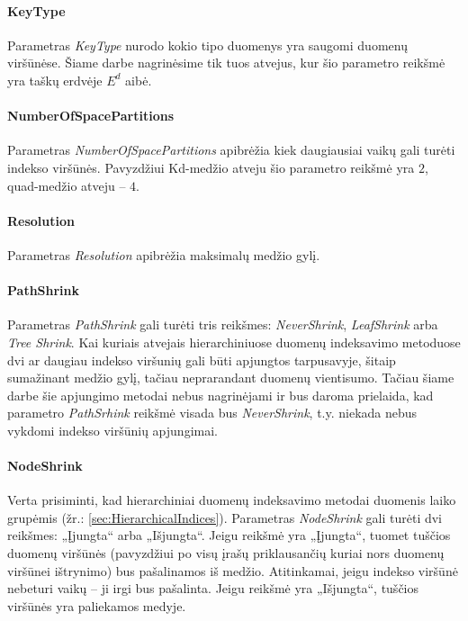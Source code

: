 \paragraph{KeyType}
Parametras {\it KeyType} nurodo kokio tipo duomenys yra saugomi duomenų viršūnėse.
Šiame darbe nagrinėsime tik tuos atvejus, kur šio parametro reikšmė yra taškų erdvėje $E^d$ aibė.

\paragraph{NumberOfSpacePartitions}
Parametras {\it NumberOfSpacePartitions} apibrėžia kiek daugiausiai vaikų gali turėti indekso viršūnės.
Pavyzdžiui Kd-medžio atveju šio parametro reikšmė yra $2$, quad-medžio atveju -- $4$.

\paragraph{Resolution}
Parametras {\it Resolution} apibrėžia maksimalų medžio gylį.

\paragraph{PathShrink}
Parametras {\it PathShrink} gali turėti tris reikšmes: {\it NeverShrink}, {\it LeafShrink} arba {\it Tree Shrink}.
Kai kuriais atvejais hierarchiniuose duomenų indeksavimo metoduose dvi ar daugiau indekso viršunių gali būti apjungtos tarpusavyje, šitaip sumažinant medžio gylį, tačiau neprarandant duomenų vientisumo.
Tačiau šiame darbe šie apjungimo metodai nebus nagrinėjami ir bus daroma prielaida, kad parametro {\it PathSrhink} reikšmė visada bus {\it NeverShrink}, t.y. niekada nebus vykdomi indekso viršūnių apjungimai.

\paragraph{NodeShrink}
Verta prisiminti, kad hierarchiniai duomenų indeksavimo metodai duomenis laiko grupėmis (žr.: \ref{sec:HierarchicalIndices}).
Parametras {\it NodeShrink} gali turėti dvi reikšmes: „Įjungta“ arba „Išjungta“.
Jeigu reikšmė yra „Įjungta“, tuomet tuščios duomenų viršūnės (pavyzdžiui po visų įrašų priklausančių kuriai nors duomenų viršūnei ištrynimo) bus pašalinamos iš medžio.
Atitinkamai, jeigu indekso viršūnė nebeturi vaikų -- ji irgi bus pašalinta.
Jeigu reikšmė yra „Išjungta“, tuščios viršūnės yra paliekamos medyje.



